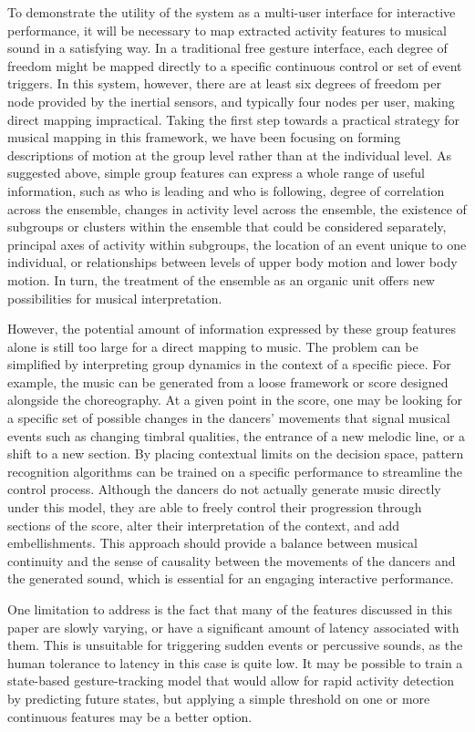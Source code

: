 To demonstrate the utility of the system as a multi-user interface for
interactive performance, it will be necessary to map extracted activity features
to musical sound in a satisfying way. In a traditional free gesture interface,
each degree of freedom might be mapped directly to a specific continuous control
or set of event triggers. In this system, however, there are at least six degrees
of freedom per node provided by the inertial sensors, and typically four nodes
per user, making direct mapping impractical. Taking the first step towards a
practical strategy for musical mapping in this framework, we have been focusing
on forming descriptions of motion at the group level rather than at the
individual level. As suggested above, simple group features can express a whole
range of useful information, such as who is leading and who is following, degree
of correlation across the ensemble, changes in activity level across the
ensemble, the existence of subgroups or clusters within the ensemble that could
be considered separately, principal axes of activity within subgroups, the
location of an event unique to one individual, or relationships between levels of
upper body motion and lower body motion.  In turn, the treatment of the ensemble
as an organic unit offers new possibilities for musical interpretation.

However, the potential amount of information expressed by these group features
alone is still too large for a direct mapping to music.  The problem can be
simplified by interpreting group dynamics in the context of a specific piece. For
example, the music can be generated from a loose framework or score designed
alongside the choreography. At a given point in the score, one may be looking for
a specific set of possible changes in the dancers' movements that signal musical
events such as changing timbral qualities, the entrance of a new melodic line, or
a shift to a new section. By placing contextual limits on the decision space,
pattern recognition algorithms can be trained on a specific performance to
streamline the control process. Although the dancers do not actually generate
music directly under this model, they are able to freely control their
progression through sections of the score, alter their interpretation of the
context, and add embellishments. This approach should provide a balance between
musical continuity and the sense of causality between the movements of the
dancers and the generated sound, which is essential for an engaging interactive
performance.

One limitation to address is the fact that many of the features discussed in
this paper are slowly varying, or have a significant amount of latency associated
with them. This is unsuitable for triggering sudden events or percussive sounds,
as the human tolerance to latency in this case is quite low. It may be possible
to train a state-based gesture-tracking model that would allow for rapid activity
detection by predicting future states, but applying a simple threshold on one or
more continuous features may be a better option.

